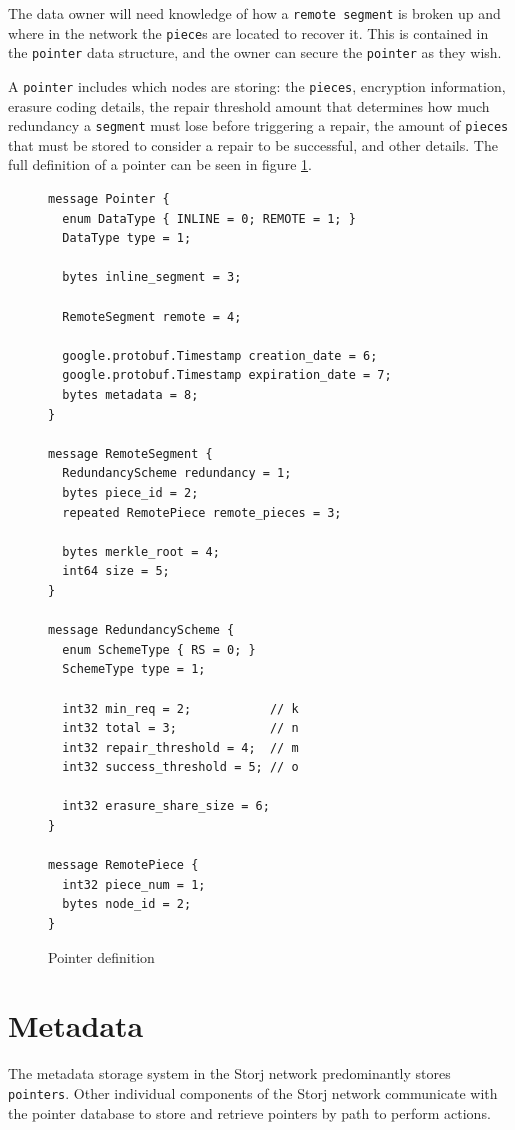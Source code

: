 \documentclass[11pt,fleqn,openany]{book}
\newcommand{\x}[1]{{\tt #1}} \newcommand{\code}[1]{{\em #1}}
\begin{document}
The data owner will need knowledge of how a \x{remote segment} is broken up and
where in the network the \x{piece}s are located to recover it. This is contained
in the \x{pointer} data structure, and the owner can secure the \x{pointer} as
they wish.

A \x{pointer} includes which nodes are storing: the \x{pieces},
encryption information, erasure coding details,
the repair threshold amount that determines how much redundancy a \x{segment}
must lose before triggering a repair, the amount of \x{pieces} that must be
stored to consider a repair to be successful, and other details. The full
definition of a pointer can be seen in figure \ref{fig:pointer}.

\begin{figure}
\lstset{language=protobuf}
\begin{lstlisting}
message Pointer {
  enum DataType { INLINE = 0; REMOTE = 1; }
  DataType type = 1;

  bytes inline_segment = 3;

  RemoteSegment remote = 4;

  google.protobuf.Timestamp creation_date = 6;
  google.protobuf.Timestamp expiration_date = 7;
  bytes metadata = 8;
}

message RemoteSegment {
  RedundancyScheme redundancy = 1;
  bytes piece_id = 2;
  repeated RemotePiece remote_pieces = 3;

  bytes merkle_root = 4;
  int64 size = 5;
}

message RedundancyScheme {
  enum SchemeType { RS = 0; }
  SchemeType type = 1;

  int32 min_req = 2;           // k
  int32 total = 3;             // n
  int32 repair_threshold = 4;  // m
  int32 success_threshold = 5; // o

  int32 erasure_share_size = 6;
}

message RemotePiece {
  int32 piece_num = 1;
  bytes node_id = 2;
}
\end{lstlisting}
\caption{Pointer definition}
\label{fig:pointer}
\end{figure}

\section{Metadata}\label{sec:concrete-metadata}

The metadata storage system in the Storj network predominantly stores
\x{pointers}. Other individual components of the Storj network communicate with
the pointer database to store and retrieve pointers by path to perform actions.
\end{document}
